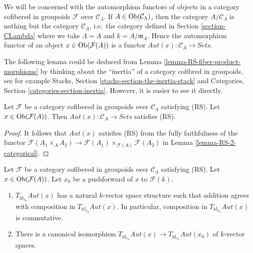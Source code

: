 \noindent
We will be concerned with the automorphism functors of objects in a category
cofibered in groupoids $\mathcal{F}$ over $\mathcal{C}_\Lambda$. If
$A \in \mathop{\rm Ob}\nolimits(\mathcal{C}_\Lambda)$, then the category
$A/\mathcal{C}_\Lambda$ is nothing but the category $\mathcal{C}_A$,
i.e.\ the category defined in Section \ref{section-CLambda}
where we take $\Lambda = A$ and $k = A/\mathfrak m_A$.
Hence the automorphism functor of an object
$x \in \mathop{\rm Ob}\nolimits(\mathcal{F}(A))$ is a functor
$\mathit{Aut}(x) : \mathcal{C}_A \to \textit{Sets}$.

\medskip\noindent
The following lemma could be deduced from
Lemma \ref{lemma-RS-fiber-product-morphisms}
by thinking about the ``inertia'' of a category cofibred in groupoids,
see for example
Stacks, Section \ref{stacks-section-the-inertia-stack}
and
Categories, Section \ref{categories-section-inertia}.
However, it is easier to see it directly.

\begin{lemma}
\label{lemma-Aut-functor-RS}
Let $\mathcal{F}$ be a category cofibered in groupoids over
$\mathcal{C}_\Lambda$ satisfying (RS). Let
$x \in \mathop{\rm Ob}\nolimits(\mathcal{F}(A))$. Then
$\mathit{Aut}(x): \mathcal{C}_A \to \textit{Sets}$ satisfies (RS).
\end{lemma}

\begin{proof}
It follows that $\mathit{Aut}(x)$ satisfies (RS) from the fully
faithfulness of the functor
$\mathcal{F}(A_1 \times_A A_2) \to
\mathcal{F}(A_1) \times_{\mathcal{F}(A)} \mathcal{F}(A_2)$ in
Lemma \ref{lemma-RS-2-categorical}.
\end{proof}

\begin{lemma}
\label{lemma-Aut-functor-tangent-space}
Let $\mathcal{F}$ be a category cofibered in groupoids over
$\mathcal{C}_\Lambda$ satisfying (RS). Let
$x \in \mathop{\rm Ob}\nolimits(\mathcal{F}(A))$. Let $x_0$ be a pushforward of $x$ to
$\mathcal{F}(k)$.
\begin{enumerate}
\item $T_{\text{id}_{x_0}} \mathit{Aut}(x)$ has a natural $k$-vector
space structure such that addition agrees with composition in
$T_{\text{id}_{x_0}} \mathit{Aut}(x)$. In particular, composition in
$T_{\text{id}_{x_0}} \mathit{Aut}(x)$ is commutative.
\item There is a canonical isomorphism
$T_{\text{id}_{x_0}} \mathit{Aut}(x) \to
T_{\text{id}_{x_0}} \mathit{Aut}(x_0)$
of $k$-vector spaces.
\end{enumerate}
\end{lemma}

